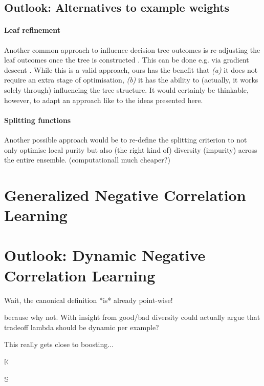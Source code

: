 \documentclass[
    a4paper, %
	fontsize=10pt, %
	twoside=false, %
]{kaobook}
\begin{document}
\subsection{Outlook: Alternatives to example weights}

\paragraph{Leaf refinement} Another common approach to influence decision tree outcomes is re-adjusting the leaf outcomes once the tree is constructed \cite{others}. This can be done e.g. via gradient descent \cite{buschj-negative-correlation-forests}. While this is a valid approach, ours has the benefit that \textit{(a)} it does not require an extra stage of optimisation, \textit{(b)} it has the ability to (actually, it works solely through) influencing the tree structure. It would certainly be thinkable, however, to adapt an approach like \cite{buschj-ncl-forests} to the ideas presented here.

\paragraph{Splitting functions} Another possible approach would be to re-define the splitting criterion to not only optimise local purity but also (the right kind of) diversity (impurity) across the entire ensemble. (computationall much cheaper?)

\section{Generalized Negative Correlation Learning}




\section{Outlook: Dynamic Negative Correlation Learning}

Wait, the canonical definition *is* already point-wise!

because why not. 
With insight from good/bad diversity could actually argue that tradeoff lambda should be dynamic per example?

This really gets close to boosting...

$\mathbb{K}$

$\mathbb{S}$
\end{document}
